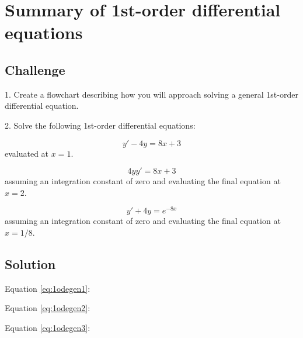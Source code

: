 \newpage
\section{Summary of 1st-order differential equations}

\subsection*{Challenge}
1. Create a flowchart describing how you will approach solving a general 1st-order differential equation.

2. Solve the following 1st-order differential equations:

\begin{equation}
    \label{eq:1odegen1}
    y' - 4y = 8x + 3
\end{equation}
evaluated at $x=1$.

\begin{equation}
    \label{eq:1odegen2}
    4yy' = 8x + 3
\end{equation}
assuming an integration constant of zero and evaluating the final equation at $x=2$.

\begin{equation}
    \label{eq:1odegen3}
    y' + 4y = e^{-8x}
\end{equation}
assuming an integration constant of zero and evaluating the final equation at $x=1/8$.

\subsection*{Solution}
Equation \ref{eq:1odegen1}: 

Equation \ref{eq:1odegen2}: 

Equation \ref{eq:1odegen3}: 

\fi




